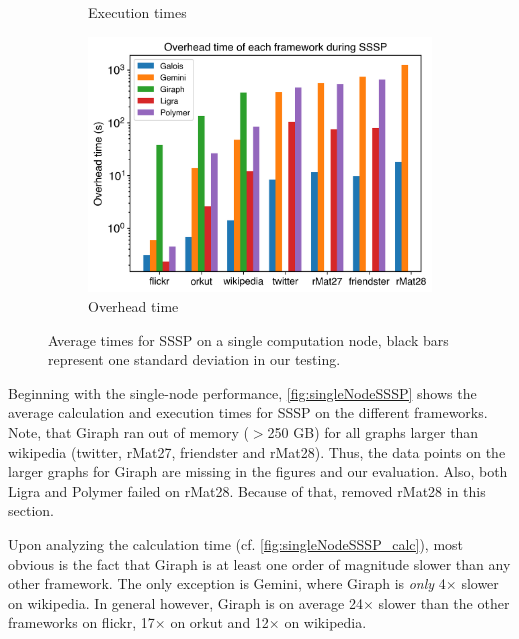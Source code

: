\begin{figure}
\begin{subfigure}{0.32\textwidth}
		\caption{Execution times}
		\label{fig:singleNodeSSSP_exec}
	\end{subfigure}
	\hfil
	\begin{subfigure}{0.32\textwidth}
		\includegraphics[width=\linewidth]{../../plots/singleNodeSSSP_overheadTime.png}
		\caption{Overhead time}
		\label{fig:singleNodeSSSP_overhead}
	\end{subfigure}
	\caption{Average times for SSSP on a single computation node, black bars represent one standard deviation in our testing.}
	\label{fig:singleNodeSSSP}
\end{figure}
Beginning with the single-node performance, \autoref{fig:singleNodeSSSP} shows the average calculation and execution times for SSSP on the different frameworks.
Note, that Giraph ran out of memory ($>$250 GB) for all graphs larger than wikipedia (twitter, rMat27, friendster and rMat28). Thus, the data points on the larger graphs for Giraph are missing in the figures and our evaluation. 
Also, both Ligra and Polymer failed on rMat28. Because of that, removed rMat28 in this section. 

Upon analyzing the calculation time (cf. \autoref{fig:singleNodeSSSP_calc}), most obvious is the fact that Giraph is at least one order of magnitude slower than any other framework. The only exception is Gemini, where Giraph is \emph{only} 4$\times$ slower on wikipedia. In general however, Giraph is on average 24$\times$ slower than the other frameworks on flickr, 17$\times$ on orkut and 12$\times$ on wikipedia.

